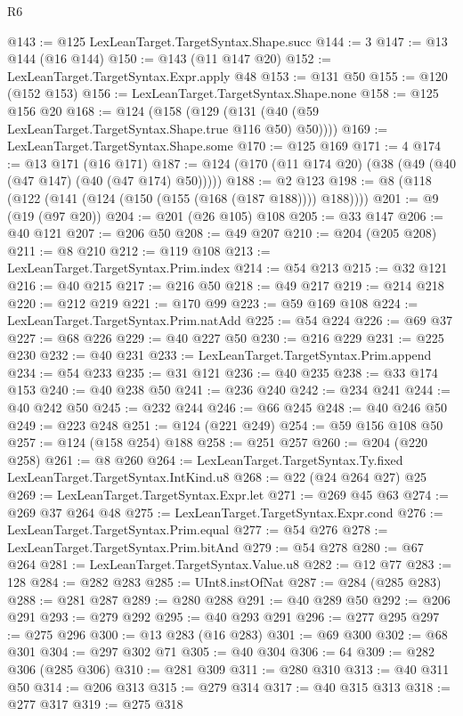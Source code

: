 \begin{lexlean}{R6}
\begin{coremodule}
@143 := @125 LexLeanTarget.TargetSyntax.Shape.succ
@144 := 3
@147 := @13 @144 (@16 @144)
@150 := @143 (@11 @147 @20)
@152 := LexLeanTarget.TargetSyntax.Expr.apply @48
@153 := @131 @50
@155 := @120 (@152 @153)
@156 := LexLeanTarget.TargetSyntax.Shape.none
@158 := @125 @156 @20
@168 := @124 (@158 (@129 (@131 (@40 (@59 LexLeanTarget.TargetSyntax.Shape.true @116 @50) @50))))
@169 := LexLeanTarget.TargetSyntax.Shape.some
@170 := @125 @169
@171 := 4
@174 := @13 @171 (@16 @171)
@187 := @124 (@170 (@11 @174 @20) (@38 (@49 (@40 (@47 @147) (@40 (@47 @174) @50)))))
@188 := @2 @123
@198 := @8 (@118 (@122 (@141 (@124 (@150 (@155 (@168 (@187 @188)))) @188))))
@201 := @9 (@19 (@97 @20))
@204 := @201 (@26 @105) @108
@205 := @33 @147
@206 := @40 @121
@207 := @206 @50
@208 := @49 @207
@210 := @204 (@205 @208)
@211 := @8 @210
@212 := @119 @108
@213 := LexLeanTarget.TargetSyntax.Prim.index
@214 := @54 @213
@215 := @32 @121
@216 := @40 @215
@217 := @216 @50
@218 := @49 @217
@219 := @214 @218
@220 := @212 @219
@221 := @170 @99
@223 := @59 @169 @108
@224 := LexLeanTarget.TargetSyntax.Prim.natAdd
@225 := @54 @224
@226 := @69 @37
@227 := @68 @226
@229 := @40 @227 @50
@230 := @216 @229
@231 := @225 @230
@232 := @40 @231
@233 := LexLeanTarget.TargetSyntax.Prim.append
@234 := @54 @233
@235 := @31 @121
@236 := @40 @235
@238 := @33 @174 @153
@240 := @40 @238 @50
@241 := @236 @240
@242 := @234 @241
@244 := @40 @242 @50
@245 := @232 @244
@246 := @66 @245
@248 := @40 @246 @50
@249 := @223 @248
@251 := @124 (@221 @249)
@254 := @59 @156 @108 @50
@257 := @124 (@158 @254) @188
@258 := @251 @257
@260 := @204 (@220 @258)
@261 := @8 @260
@264 := LexLeanTarget.TargetSyntax.Ty.fixed LexLeanTarget.TargetSyntax.IntKind.u8
@268 := @22 (@24 @264 @27) @25
@269 := LexLeanTarget.TargetSyntax.Expr.let
@271 := @269 @45 @63
@274 := @269 @37 @264 @48
@275 := LexLeanTarget.TargetSyntax.Expr.cond
@276 := LexLeanTarget.TargetSyntax.Prim.equal
@277 := @54 @276
@278 := LexLeanTarget.TargetSyntax.Prim.bitAnd
@279 := @54 @278
@280 := @67 @264
@281 := LexLeanTarget.TargetSyntax.Value.u8
@282 := @12 @77
@283 := 128
@284 := @282 @283
@285 := UInt8.instOfNat
@287 := @284 (@285 @283)
@288 := @281 @287
@289 := @280 @288
@291 := @40 @289 @50
@292 := @206 @291
@293 := @279 @292
@295 := @40 @293 @291
@296 := @277 @295
@297 := @275 @296
@300 := @13 @283 (@16 @283)
@301 := @69 @300
@302 := @68 @301
@304 := @297 @302 @71
@305 := @40 @304
@306 := 64
@309 := @282 @306 (@285 @306)
@310 := @281 @309
@311 := @280 @310
@313 := @40 @311 @50
@314 := @206 @313
@315 := @279 @314
@317 := @40 @315 @313
@318 := @277 @317
@319 := @275 @318

\end{coremodule}
\end{lexlean}
